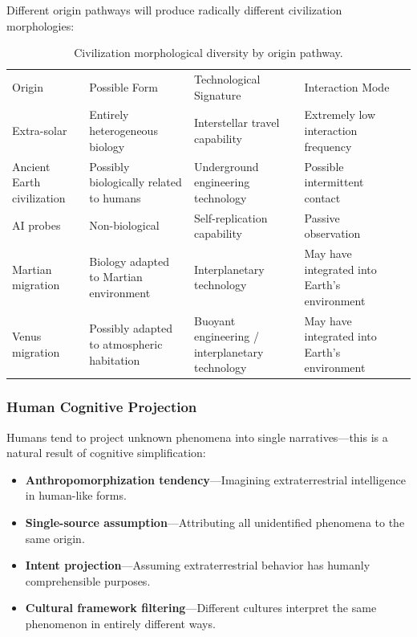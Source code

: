 \documentclass[aps,prd,twocolumn,superscriptaddress,nofootinbib]{revtex4-2}
\begin{document}
Different origin pathways will produce radically different civilization morphologies:

\begin{table}[htbp]
\caption{Civilization morphological diversity by origin pathway.}
\label{tab:morphological}
\begin{ruledtabular}
\begin{tabular}{lllll}
Origin & Possible Form & Technological Signature & Interaction Mode \\
\colrule
Extra-solar & Entirely heterogeneous biology & Interstellar travel capability & Extremely low interaction frequency \\
Ancient Earth civilization & Possibly biologically related to humans & Underground engineering technology & Possible intermittent contact \\
AI probes & Non-biological & Self-replication capability & Passive observation \\
Martian migration & Biology adapted to Martian environment & Interplanetary technology & May have integrated into Earth's environment \\
Venus migration & Possibly adapted to atmospheric habitation & Buoyant engineering / interplanetary technology & May have integrated into Earth's environment \\
\end{tabular}
\end{ruledtabular}
\end{table}

\subsubsection{Human Cognitive Projection}\label{sec:cognitive-projection}

Humans tend to project unknown phenomena into single narratives---this is a natural result of cognitive simplification:

\begin{itemize}
  \item \textbf{Anthropomorphization tendency}---Imagining extraterrestrial intelligence in human-like forms.
  \item \textbf{Single-source assumption}---Attributing all unidentified phenomena to the same origin.
  \item \textbf{Intent projection}---Assuming extraterrestrial behavior has humanly comprehensible purposes.
  \item \textbf{Cultural framework filtering}---Different cultures interpret the same phenomenon in entirely different ways.
\end{itemize}
\end{document}
